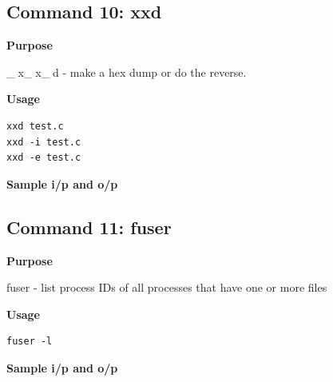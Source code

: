 \documentclass{article}
\begin{document}
\subsection{Command 10: xxd} 
\textbf{Purpose}
\begin{flushleft}
       _x_x_d - make a hex dump or do the reverse.
\end{flushleft}
\textbf{Usage}
\begin{verbatim}
xxd test.c
xxd -i test.c
xxd -e test.c
\end{verbatim}
\textbf{Sample i/p and o/p}
\begin{figure}[H] 
\end{figure}
\subsection{Command 11: fuser} 
\textbf{Purpose}
\begin{flushleft}
       fuser - list process IDs of all processes that have one or more files
\end{flushleft}
\textbf{Usage}
\begin{verbatim}
fuser -l
\end{verbatim}
\textbf{Sample i/p and o/p}
\begin{figure}[H] 
\end{figure}
\end{document}
